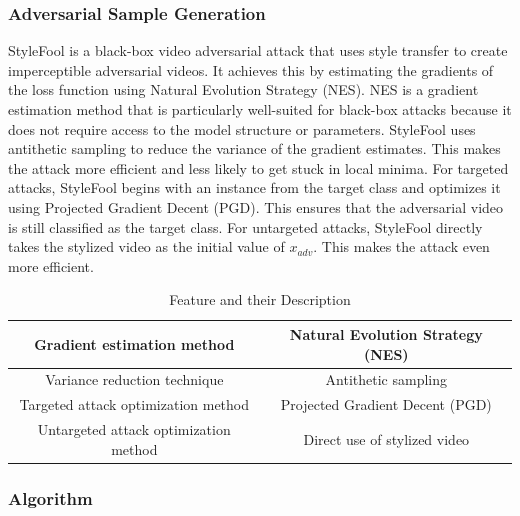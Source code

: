 \subsubsection{Adversarial Sample Generation}
StyleFool is a black-box video adversarial attack that uses style transfer to create imperceptible adversarial videos. It achieves this by estimating the gradients of the loss function using Natural Evolution Strategy (NES). NES is a gradient estimation method that is particularly well-suited for black-box attacks because it does not require access to the model structure or parameters. StyleFool uses antithetic sampling to reduce the variance of the gradient estimates. This makes the attack more efficient and less likely to get stuck in local minima. For targeted attacks, StyleFool begins with an instance from the target class and optimizes it using Projected Gradient Decent (PGD). This ensures that the adversarial video is still classified as the target class. For untargeted attacks, StyleFool directly takes the stylized video as the initial value of $x_{adv}$. This makes the attack even more efficient.

\begin{table}[H]
\centering
\begin{tabular}{ |c|c|  }
\hline
 Gradient estimation method & Natural Evolution Strategy (NES)  \\ 
 \hline
 Variance reduction technique & Antithetic sampling  \\  
 \hline
 Targeted attack optimization method & Projected Gradient Decent (PGD) \\
 \hline
 Untargeted attack optimization method & Direct use of stylized video \\
 \hline
\end{tabular}
\caption{Feature and their Description}
\label{tab:Table1}
\end{table}


\subsubsection{Algorithm}

